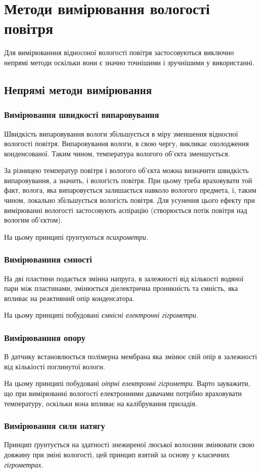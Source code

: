 \chapter{Методи вимірювання вологості повітря}

Для вимірюванння відносоної вологості повітря застосовуються виключно непрямі методи оскільки вони є
значно точнішими і зручнішими у використанні.

\section{Непрямі методи вимірювання}

\subsection{Вимірювання швидкості випаровування}

Швидкість випаровування вологи збільшується в міру зменшення відносної вологості повітря.
Випаровування вологи, в свою чергу, викликає охолодження конденсованої. Таким чином, температура
вологого об'єкта зменшується.

За різницею температур повітря і вологого об'єкта можна визначити
швидкість випаровування, а значить, і вологість повітря. При цьому треба враховувати той факт,
волога, яка випаровується залишається навколо вологого предмета, і, таким чином, локально
збільшується вологість повітря. Для усунення цього ефекту при вимірюванні вологості застосовують
аспірацію (створюється потік повітря над вологим об'єктом).

На цьому принципі ґрунтуються \textit{психрометри}.

\subsection{Вимірюванння ємності}

На дві пластини подається змінна напруга, в залежності від кількості водяної пари між пластинами,
змінюється діелектрична проникність та ємність, яка впливає на реактивний опір конденсатора.

На цьому принципі побудовані \textit{ємнісні електронні гігрометри}.

\subsection{Вимірюванння опору}

В датчику встановлюється полімерна мембрана яка змінює свій опір в залежності від кількіості
поглинутої вологи.

На цьому принципі побудовані \textit{оіпрні електронні гігрометри}. Варто зауважити, що при
вимірюванні вологості електронними давачами потрібно враховувати температуру, оскільки вона впливає
на калібрування приладів.

\subsection{Вимірювання сили натягу}

Принцип ґрунтується на здатності знежиреної люської волосини змінювати свою довжину при зміні
вологості, цей принцип взятий за основу у класичних \textit{гігрометрах}.
